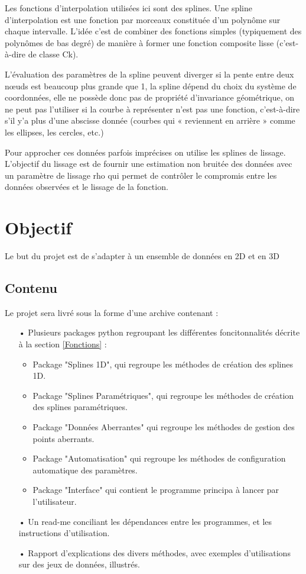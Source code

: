 \documentclass[a4paper,12pt]{article}
\begin{document}
Les fonctions d’interpolation utilisées ici sont des splines.
Une spline d’interpolation est une fonction par morceaux constituée d’un polynôme sur chaque intervalle.
L’idée c’est de combiner des fonctions simples (typiquement des polynômes de bas degré) de manière à former une fonction composite lisse (c’est-à-dire de classe Ck).

L’évaluation des paramètres de la spline peuvent diverger si la pente entre deux nœuds est beaucoup plus grande que 1, la spline dépend du choix du système de coordonnées, elle ne possède donc pas de propriété d’invariance géométrique, on ne peut pas l’utiliser si la courbe à représenter n’est pas une fonction, c’est-à-dire s’il y’a plus d’une abscisse donnée (courbes qui « reviennent en arrière » comme les ellipses, les cercles, etc.)

Pour approcher ces données parfois imprécises on utilise les splines de lissage. L’objectif du lissage est de fournir une estimation non bruitée des données avec un paramètre de lissage rho qui permet de contrôler le compromis entre les données observées et le lissage de la fonction.

\newpage
\section{Objectif}

Le but du projet est de s'adapter à un ensemble de données en 2D et en 3D

\subsection*{Contenu}
Le projet sera livré sous la forme d'une archive contenant :
\begin{itemize}
\item[•] Plusieurs packages python regroupant les différentes foncitonnalités décrite à la section \ref{Fonctions}  : 
\begin{itemize}
\item Package "Splines 1D", qui regroupe les méthodes de création des splines 1D.
\item Package "Splines Paramétriques", qui regroupe les méthodes de création des splines paramétriques.
\item Package "Données Aberrantes" qui regroupe les méthodes de gestion des points aberrants.
\item Package "Automatisation" qui regroupe les méthodes de configuration automatique des paramètres.
\item Package "Interface" qui contient le programme principa à lancer par l'utilisateur.
\end{itemize}
\item[•] Un read-me conciliant les dépendances entre les programmes, et les instructions d'utilisation.
\item[•] Rapport d'explications des divers méthodes, avec exemples d’utilisations sur des jeux de données, illustrés.
\end{itemize}
\end{document}
